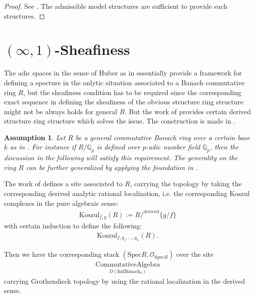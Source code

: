 \documentclass[12pt]{book}
\newtheorem{assumption}{Assumption}
\begin{document}
\begin{proof}
See \cite{BBBK}. The admissible model structures are sufficient to provide such structures.
\end{proof}








\newpage
\section{$(\infty,1)$-Sheafiness}

\indent The adic spaces in the sense of Huber as in \cite{Hu} essentially provide a framework for defining a specture in the anlytic situation associated to a Banach commutative ring $R$, but the sheafiness condition has to be required since the corresponding exact sequence in defining the sheafiness of the obvious structure ring structure might not be always holds for general $R$. But the work of \cite{BBBK} provides certain derived structure ring structure which solves the issue. The construction is made in \cite{BK}.

\begin{assumption}
Let $R$ be a general commutative Banach ring over a certain base $k$ as in \cite{BK}. For instance if $R/\mathbb{Q}_p$ is defined over $p$-adic number field $\mathbb{Q}_p$, then the discussion in the following will satisfy this requirement. The generality on the ring $R$ can be further generalized by applying the foundation in \cite{Ked1}.
\end{assumption}

\noindent The work of \cite{BK} defines a site associated to $R$, carrying the topology by taking the corresponding derived analytic rational localization, i.e. the corresponding Koszul complexes in the pure algebraic sense:
\begin{align}
\mathrm{Koszul}_{f,g}(R):=R/^\mathrm{derived}\{g/f\}
\end{align}
with certain induction to define the following:
\begin{align}
\mathrm{Koszul}_{f,g_1,...,g_n}(R).
\end{align}

Then we have the corresponding stack $(\mathrm{Spec}R,\mathcal{O}_{\mathrm{Spec}R})$ over the site 
\begin{align}
\underset{D(\mathrm{Ind}\mathrm{Banach}_k)}{\mathrm{CommutativeAlgebra}}
\end{align}
carrying Grothendieck topology by using the rational localization in the derived sense.
\end{document}
